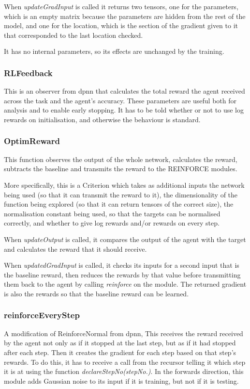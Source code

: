 When \emph{updateGradInput} is called it returns two tensors, one for the parameters, which is an empty matrix because the parameters are hidden from the rest of the model, and one for the location, which is the section of the gradient given to it that corresponded to the last location checked.

It has no internal parameters, so its effects are unchanged by the training.
\subsubsection{RLFeedback}
This is an observer from dpnn that calculates the total reward the agent received across the task and the agent's accuracy. These parameters are useful both for analysis and to enable early stopping. It has to be told whether or not to use log rewards on initialisation, and otherwise the behaviour is standard.

\subsubsection{OptimReward}%
This function observes the output of the whole network, calculates the reward, subtracts the baseline and transmits the reward to the REINFORCE modules.

More specifically, this is a Criterion which takes as additional inputs the network being used (so that it can transmit the reward to it), the dimensionality of the function being explored (so that it can return tensors of the correct size), the normalisation constant being used, so that the targets can be normalised correctly, and whether to give log rewards and/or rewards on every step.

When \emph{updateOutput} is called,  it compares the output of the agent with the target and calculates the reward that it should receive.

When \emph{updatedGradInput} is called, it checks its inputs for a second input that is the baseline reward, then reduces the rewards by that value before transmitting them back to the agent by calling \emph{reinforce} on the module. The returned gradient is also the rewards so that the baseline reward can be learned.

\subsubsection{reinforceEveryStep}
A modification of ReinforceNormal from dpnn, This receives the reward received by the agent not only as if it stopped at the last step, but as if it had stopped after each step. Then it creates the gradient for each step based on that step's rewards. To do this, it has to receive a call from the recursor telling it which step it is at using the function \emph{declareStepNo(stepNo.)}. In the forwards direction, this module adds Gaussian noise to its input if it is training, but not if it is testing.

